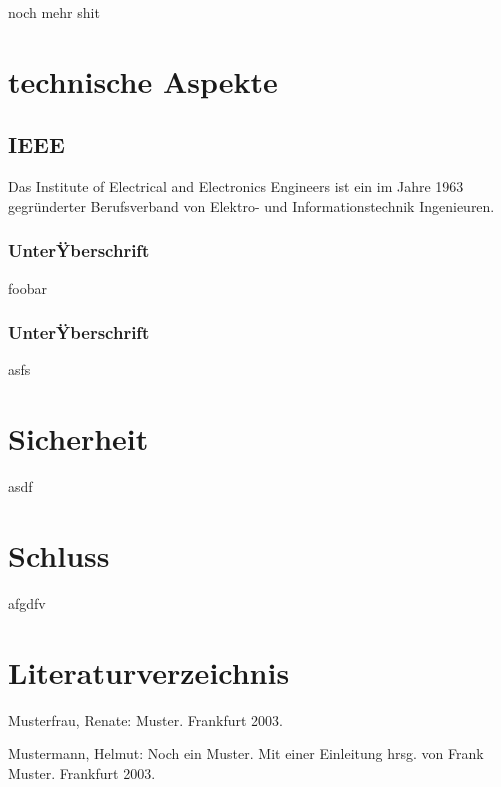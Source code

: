 \documentclass[a4paper,12pt]{scrartcl}
\begin{document}
noch mehr shit

\section{technische Aspekte}
\subsection{IEEE}
Das Institute of Electrical and Electronics Engineers ist ein im Jahre 1963 gegr\"{u}nderter Berufsverband von Elektro- und Informationstechnik Ingenieuren. 
\subsubsection{UnterŸberschrift}
foobar
\subsubsection{UnterŸberschrift}
asfs
\section{Sicherheit}
asdf

\section{Schluss}
afgdfv

\clearpage

\section{Literaturverzeichnis}

Musterfrau, Renate: Muster. Frankfurt 2003.


Mustermann, Helmut: Noch ein Muster. Mit einer Einleitung hrsg. von Frank Muster. Frankfurt 2003.
\end{document}
